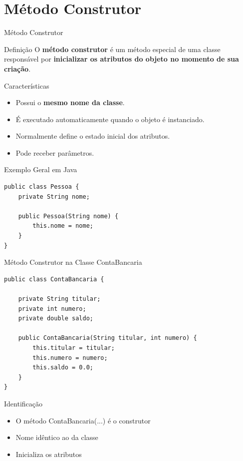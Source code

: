 \documentclass[9pt]{beamer}
\begin{document}
\section{Método Construtor}
\begin{frame}[fragile]{Método Construtor}

\begin{block}{Definição}
O \textbf{método construtor} é um método especial de uma classe responsável por
\textbf{inicializar os atributos do objeto no momento de sua criação}.
\end{block}

\begin{block}{Características}
\begin{itemize}
    \item Possui o \textbf{mesmo nome da classe}.
    \item É executado automaticamente quando o objeto é instanciado.
    \item Normalmente define o estado inicial dos atributos.
    \item Pode receber parâmetros.
\end{itemize}
\end{block}
 
\begin{block}{Exemplo Geral em Java}
\begin{verbatim}
public class Pessoa {
    private String nome;

    public Pessoa(String nome) {
        this.nome = nome;
    }
}
\end{verbatim}
\end{block}

\end{frame}
\begin{frame}[fragile]{Método Construtor na Classe ContaBancaria}

\begin{verbatim}
public class ContaBancaria {

    private String titular;
    private int numero;
    private double saldo;

    public ContaBancaria(String titular, int numero) {
        this.titular = titular;
        this.numero = numero;
        this.saldo = 0.0;
    }
}
\end{verbatim}

\begin{block}{Identificação}
\begin{itemize}
    \item O método ContaBancaria(...) é o construtor
    \item Nome idêntico ao da classe
    \item Inicializa os atributos
\end{itemize}
\end{block}

\end{frame}
\end{document}
